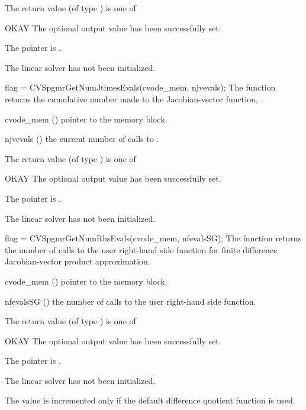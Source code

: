 {
  The return value  (of type ) is one of
  \begin{args}
  \item[OKAY] 
    The optional output value has been successfully set.
  \item[\Id{LIN\_NO\_MEM}]
    The  pointer is .
  \item[\Id{LIN\_NO\_LMEM}]
    The {\cvspgmr} linear solver has not been initialized.
  \end{args}
}
{}
{
  flag = CVSpgmrGetNumJtimesEvals(cvode\_mem, njvevals);
}
{
  The function  returns the
  cumulative number made to the Jacobian-vector function,
  .
}
{
  \begin{args}
  \item[cvode\_mem] ()
    pointer to the {\cvode} memory block.
  \item[njvevals] ()
    the current number of calls to .
  \end{args}
}
{
  The return value  (of type ) is one of
  \begin{args}
  \item[OKAY] 
    The optional output value has been successfully set.
  \item[\Id{LIN\_NO\_MEM}]
    The  pointer is .
  \item[\Id{LIN\_NO\_LMEM}]
    The {\cvspgmr} linear solver has not been initialized.
  \end{args}
}
{}
{
  flag = CVSpgmrGetNumRhsEvals(cvode\_mem, nfevalsSG);
}
{
  The function  returns the
  number of calls to the user right-hand side function for
  finite difference Jacobian-vector product approximation.
}
{
  \begin{args}
  \item[cvode\_mem] ()
    pointer to the {\cvode} memory block.
  \item[nfevalsSG] ()
    the number of calls to the user right-hand side function.
  \end{args}
}
{
  The return value  (of type ) is one of
  \begin{args}
  \item[OKAY] 
    The optional output value has been successfully set.
  \item[\Id{LIN\_NO\_MEM}]
    The  pointer is .
  \item[\Id{LIN\_NO\_LMEM}]
    The {\cvspgmr} linear solver has not been initialized.
  \end{args}
}
{
  The value  is incremented only if the default 
   difference quotient function is used.
}

